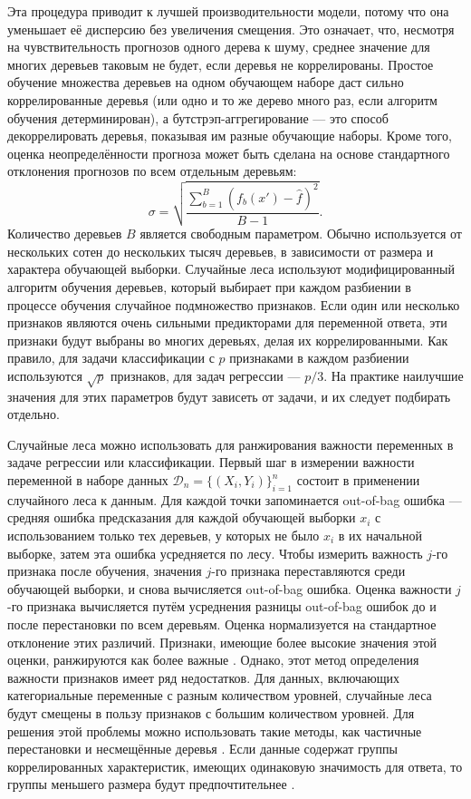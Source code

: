 Эта процедура приводит к лучшей производительности модели, потому что она уменьшает её дисперсию без увеличения смещения. Это означает, что, несмотря на чувствительность прогнозов одного дерева к шуму, среднее значение для многих деревьев таковым не будет, если деревья не коррелированы. Простое обучение множества деревьев на одном обучающем наборе даст сильно коррелированные деревья (или одно и то же дерево много раз, если алгоритм обучения детерминирован), а бутстрэп-аггрегирование --- это способ декоррелировать деревья, показывая им разные обучающие наборы. Кроме того, оценка неопределённости прогноза может быть сделана на основе стандартного отклонения прогнозов по всем отдельным деревьям:
\begin{equation}
\label{eq:rf_error}
\sigma = {\sqrt{\frac{\sum_{b = 1}^{B} (f_{b} (x') - {\hat{f}})^{2}} {B-1}}}.
\end{equation}
Количество деревьев $B$ является свободным параметром. Обычно используется от нескольких сотен до нескольких тысяч деревьев, в зависимости от размера и характера обучающей выборки. Случайные леса используют модифицированный алгоритм обучения деревьев, который выбирает при каждом разбиении в процессе обучения случайное подмножество признаков. Если один или несколько признаков являются очень сильными предикторами для переменной ответа, эти признаки будут выбраны во многих деревьях, делая их коррелированными. Как правило, для задачи классификации с $p$ признаками в каждом разбиении используются $\sqrt{p}$ признаков, для задач регрессии --- $p / 3$. На практике наилучшие значения для этих параметров будут зависеть от задачи, и их следует подбирать отдельно.

Случайные леса можно использовать для ранжирования важности переменных в задаче регрессии или классификации. Первый шаг в измерении важности переменной в наборе данных $\mathcal{D}_{n} = \{(X_{i}, Y_{i}) \}_{i = 1}^{n}$ состоит в применении случайного леса к данным. Для каждой точки запоминается out-of-bag ошибка --- средняя ошибка предсказания для каждой обучающей выборки $x_i$ с использованием только тех деревьев, у которых не было $x_i$ в их начальной выборке, затем эта ошибка усредняется по лесу. Чтобы измерить важность $j$-го признака после обучения, значения $j$-го признака переставляются среди обучающей выборки, и снова вычисляется out-of-bag ошибка. Оценка важности $j$-го признака вычисляется путём усреднения разницы out-of-bag ошибок до и после перестановки по всем деревьям. Оценка нормализуется на стандартное отклонение этих различий. Признаки, имеющие более высокие значения этой оценки, ранжируются как более важные \autocite{Zhu2015}. Однако, этот метод определения важности признаков имеет ряд недостатков. Для данных, включающих категориальные переменные с разным количеством уровней, случайные леса будут смещены в пользу признаков с большим количеством уровней. Для решения этой проблемы можно использовать такие методы, как частичные перестановки \autocite{Altmann2010} и несмещённые деревья \autocite{Strobl2007}. Если данные содержат группы коррелированных характеристик, имеющих одинаковую значимость для ответа, то группы меньшего размера будут предпочтительнее \autocite{Toloi2011}.

